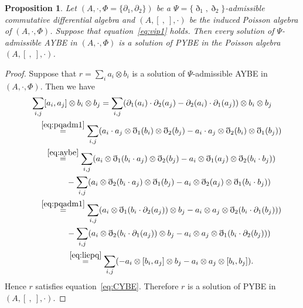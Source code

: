 \documentclass[10pt,a4paper]{amsart}
\numberwithin{equation}{section}
\newtheorem{Proposition}[Theorem]{Proposition}
{ \theoremstyle{definition}
	\newtheorem{Definition}[Theorem]{Definition}
	\newtheorem{Note}[Theorem]{Note}
	\newtheorem{Example}[Theorem]{Example}
	\newtheorem{Remark}[Theorem]{Remark} }
\begin{document}
\begin{Proposition}\label{pro:aybe_to_qybe}
 Let $(A, \cdot, \Phi = \{\partial_1, \partial_2\})$ be a $\Psi = \{\eth_1, \eth_2\}$-admissible commutative differential algebra and $(A, [\ ,\ ], \cdot)$ be the induced Poisson algebra of $(A, \cdot, \Phi)$.
 Suppose that equation~\eqref{eq:vip1} holds.
 Then every solution of $\Psi$-admissible AYBE in $(A, \cdot, \Phi)$ is a solution of PYBE in the Poisson algebra $(A, [\ ,\ ], \cdot)$.
\end{Proposition}
\begin{proof}
 Suppose that $r = \sum_i a_i \otimes b_i$ is a solution of $\Psi$-admissible AYBE in $(A, \cdot, \Phi)$.
 Then we have
 \begin{gather*}
 \sum_{i,j}[a_i,a_j] \otimes b_i \otimes b_j = \sum_{i,j}(\partial_1(a_i) \cdot \partial_2(a_j) - \partial_2(a_i) \cdot \partial_1(a_j)) \otimes b_i \otimes b_j\\
 \qquad{} \overset{\eqref{eq:pqadm1}}{=} \sum_{i,j}( a_i \cdot a_j \otimes \eth_1(b_i) \otimes \eth_2(b_j) - a_i \cdot a_j \otimes \eth_2(b_i) \otimes \eth_1(b_j) )\\
 \qquad{} \overset{\eqref{eq:aybe}}{=} \sum_{i,j}( a_i \otimes \eth_1(b_i \cdot a_j) \otimes \eth_2(b_j) - a_i \otimes \eth_1(a_j) \otimes \eth_2(b_i \cdot b_j)) \\
 \qquad\qquad {}- \sum_{i,j}( a_i \otimes \eth_2(b_i \cdot a_j) \otimes \eth_1(b_j) - a_i \otimes \eth_2(a_j) \otimes \eth_1(b_i \cdot b_j) )\\
 \qquad{} \overset{\eqref{eq:pqadm1}}{=} \sum_{i,j}( a_i \otimes \eth_1(b_i \cdot \partial_2(a_j)) \otimes b_j - a_i \otimes a_j \otimes \eth_2(b_i \cdot \partial_1(b_j))) \\
 \qquad\qquad {}- \sum_{i,j}(a_i \otimes \eth_2(b_i \cdot \partial_1(a_j)) \otimes b_j - a_i \otimes a_j \otimes \eth_1(b_i \cdot \partial_2(b_j)) )\\
 \qquad{} \overset{\eqref{eq:liepq}}{=} \sum_{i,j}( -a_i \otimes [b_i, a_j] \otimes b_j - a_i \otimes a_j \otimes [b_i,b_j]).
 \end{gather*}
 Hence $r$ satisfies equation~\eqref{eq:CYBE}.
 Therefore $r$ is a solution of PYBE in $(A, [\ ,\ ], \cdot)$.
\end{proof}
\end{document}
